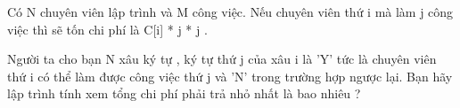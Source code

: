 Có N chuyên viên lập trình và M công việc. Nếu chuyên viên thứ i mà làm j công việc thì sẽ tốn chi phí là C[i] * j * j .   


   Người ta cho bạn N xâu ký tự , ký tự thứ j của xâu i là 'Y' tức là chuyên viên thứ i có thể làm được công việc thứ j và 'N' trong trường hợp ngược lại. Bạn hãy lập trình tính xem tổng chi phí phải trả nhỏ nhất là bao nhiêu ?